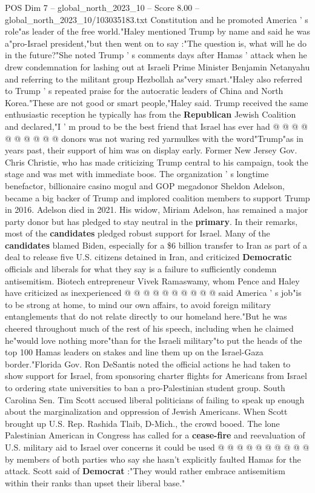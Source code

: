 \begin{textsample}{POS Dim 7 – global\_north\_2023\_10 – Score 8.00 – global\_north\_2023\_10/103035183.txt}
Constitution and he promoted America ' s role"as leader of the free world."Haley mentioned Trump by name and said he was a"pro-Israel president,"but then went on to say :"The question is, what will he do in the future?"She noted Trump ' s comments days after Hamas ' attack when he drew condemnation for lashing out at Israeli Prime Minister Benjamin Netanyahu and referring to the militant group Hezbollah as"very smart."Haley also referred to Trump ' s repeated praise for the autocratic leaders of China and North Korea."These are not good or smart people,"Haley said.
Trump received the same enthusiastic reception he typically has from the \textbf{Republican} Jewish Coalition and declared,"I ' m proud to be the best friend that Israel has ever had @ @ @ @ @ @ @ @ @ @ donors was not waring red yarmulkes with the word"Trump"as in years past, their support of him was on display early.
Former New Jersey Gov.
Chris Christie, who has made criticizing Trump central to his campaign, took the stage and was met with immediate boos.
The organization ' s longtime benefactor, billionaire casino mogul and GOP megadonor Sheldon Adelson, became a big backer of Trump and implored coalition members to support Trump in 2016.
Adelson died in 2021.
His widow, Miriam Adelson, has remained a major party donor but has pledged to stay neutral in the \textbf{primary}.
In their remarks, most of the \textbf{candidates} pledged robust support for Israel.
Many of the \textbf{candidates} blamed Biden, especially for a \$6 billion transfer to Iran as part of a deal to release five U.S. citizens detained in Iran, and criticized \textbf{Democratic} officials and liberals for what they say is a failure to sufficiently condemn antisemitism.
Biotech entrepreneur Vivek Ramaswamy, whom Pence and Haley have criticized as inexperienced @ @ @ @ @ @ @ @ @ @ said America ' s job"is to be strong at home, to mind our own affairs, to avoid foreign military entanglements that do not relate directly to our homeland here."But he was cheered throughout much of the rest of his speech, including when he claimed he"would love nothing more"than for the Israeli military"to put the heads of the top 100 Hamas leaders on stakes and line them up on the Israel-Gaza border."Florida Gov.
Ron DeSantis noted the official actions he had taken to show support for Israel, from sponsoring charter flights for Americans from Israel to ordering state universities to ban a pro-Palestinian student group.
South Carolina Sen.
Tim Scott accused liberal politicians of failing to speak up enough about the marginalization and oppression of Jewish Americans.
When Scott brought up U.S.
Rep.
Rashida Tlaib, D-Mich., the crowd booed.
The lone Palestinian American in Congress has called for a \textbf{cease-fire} and reevaluation of U.S. military aid to Israel over concerns it could be used @ @ @ @ @ @ @ @ @ @ by members of both parties who say she hasn't explicitly faulted Hamas for the attack.
Scott said of \textbf{Democrat} :"They would rather embrace antisemitism within their ranks than upset their liberal base."

\end{textsample}
